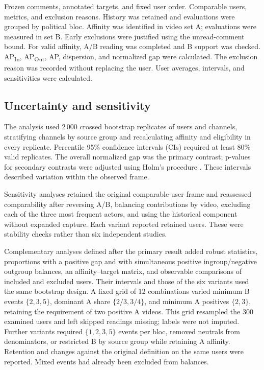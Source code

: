 \documentclass[conference,letterpaper]{IEEEtran}
\begin{document}
\begin{algorithm}[t]
\caption{Individual polarization and dispersion measurement}
\label{alg:polarization}
\begin{algorithmic}[1]
\Require Frozen comments, annotated targets, and fixed user order.
\Ensure Comparable users, metrics, and exclusion reasons.
\State History was retained and evaluations were grouped by political bloc.
\State Affinity was identified in video set A; evaluations were measured in set B.
\State Early exclusions were justified using the unread-comment bound.
\State For valid affinity, A/B reading was completed and B support was checked.
\State AP\textsubscript{In}, AP\textsubscript{Out}, AP, dispersion, and normalized gap were calculated.
\Else
\State The exclusion reason was recorded without replacing the user.
\EndIf
\EndFor
\State User averages, intervals, and sensitivities were calculated.
\end{algorithmic}
\end{algorithm}

\subsection{Uncertainty and sensitivity}
The analysis used 2\,000 crossed bootstrap replicates of users and channels, stratifying channels by source group and recalculating affinity and eligibility in every replicate. Percentile 95\% confidence intervals (CIs) required at least 80\% valid replicates. The overall normalized gap was the primary contrast; p-values for secondary contrasts were adjusted using Holm's procedure \cite{Holm1979}. These intervals described variation within the observed frame.

Sensitivity analyses retained the original comparable-user frame and reassessed comparability after reversing A/B, balancing contributions by video, excluding each of the three most frequent actors, and using the historical component without expanded capture. Each variant reported retained users. These were stability checks rather than six independent studies.

Complementary analyses defined after the primary result added robust statistics, proportions with a positive gap and with simultaneous positive ingroup/negative outgroup balances, an affinity--target matrix, and observable comparisons of included and excluded users. Their intervals and those of the six variants used the same bootstrap design. A fixed grid of 12 combinations varied minimum B events $\{2,3,5\}$, dominant A share $\{2/3,3/4\}$, and minimum A positives $\{2,3\}$, retaining the requirement of two positive A videos. This grid resampled the 300 examined users and left skipped readings missing; labels were not imputed. Further variants required $\{1,2,3,5\}$ events per bloc, removed neutrals from denominators, or restricted B by source group while retaining A affinity. Retention and changes against the original definition on the same users were reported. Mixed events had already been excluded from balances.
\end{document}

